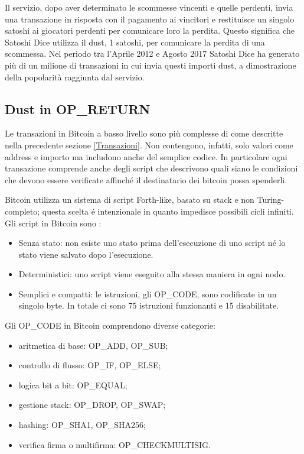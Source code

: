 Il servizio, dopo aver determinato le scommesse vincenti e quelle perdenti, invia una transazione in risposta con il pagamento ai vincitori e restituisce un singolo satoshi ai giocatori perdenti per comunicare loro la perdita. Questo significa che Satoshi Dice utilizza il dust, 1 satoshi, per comunicare la perdita di una scommessa. Nel periodo tra l'Aprile 2012 e Agosto 2017 Satoshi Dice ha generato più di un milione di transazioni in cui invia questi importi dust, a dimostrazione della popolarità raggiunta dal servizio.

\subsection{Dust in OP\_RETURN}
Le transazioni in Bitcoin a basso livello sono più complesse \cite{script} di come descritte nella precedente sezione \ref{Transazioni}. Non contengono, infatti, solo valori come address e importo ma includono anche del semplice codice. In particolare ogni transazione comprende anche degli script che descrivono quali siano le condizioni che devono essere verificate affinché il destinatario dei bitcoin possa spenderli. 

Bitcoin utilizza un sistema di script Forth-like, basato su stack e non Turing-completo; questa scelta é intenzionale in quanto impedisce possibili cicli infiniti. Gli script in Bitcoin sono \cite{opcode}:
\begin{itemize}
    \item Senza stato: non esiste uno stato prima dell'esecuzione di uno script né lo stato viene salvato dopo l'esecuzione.
    \item Deterministici: uno script viene eseguito alla stessa maniera in ogni nodo.
    \item Semplici e compatti: le istruzioni, gli OP\_CODE, sono codificate in un singolo byte. In totale ci sono 75 istruzioni funzionanti e 15 disabilitate.
\end{itemize}
Gli OP\_CODE in Bitcoin comprendono diverse categorie:
\begin{itemize}
    \item aritmetica di base: OP\_ADD, OP\_SUB;
    \item controllo di flusso: OP\_IF, OP\_ELSE;
    \item logica bit a bit: OP\_EQUAL;
    \item gestione stack: OP\_DROP, OP\_SWAP;
    \item hashing: OP\_SHA1, OP\_SHA256;
    \item verifica firma o multifirma: OP\_CHECKMULTISIG.
\end{itemize}


